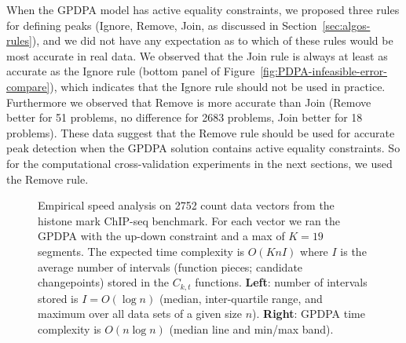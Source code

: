 \documentclass[twoside,11pt]{article}
\begin{document}
When the GPDPA model has active equality constraints, we proposed
three rules for defining peaks (Ignore, Remove, Join, as discussed in
Section~\ref{sec:algos-rules}), and we did not have any expectation as
to which of these rules would be most accurate in real data. We
observed that the Join rule is always at least as accurate as the
Ignore rule (bottom panel of
Figure~\ref{fig:PDPA-infeasible-error-compare}), which indicates that
the Ignore rule should not be used in practice. Furthermore we
observed that Remove is more accurate than Join (Remove better for 51
problems, no difference for 2683 problems, Join better for 18
problems). These data suggest that the Remove rule should be used for
accurate peak detection when the GPDPA solution contains active
equality constraints. So for the computational cross-validation
experiments in the next sections, we used the Remove rule.

%   




\begin{figure}[t!]
  \centering
  \parbox{0.49\textwidth}{
    
  }
  \parbox{0.49\textwidth}{
    
  }
  \vskip -0.5cm
  \caption{Empirical speed analysis on 2752 count data vectors from
    the histone mark ChIP-seq benchmark. For each vector we ran the
    GPDPA with the up-down constraint and a max of $K=19$
    segments. The expected time complexity is $O(KnI)$ where $I$ is
    the average number of intervals (function pieces; candidate
    changepoints) stored in the $C_{k,t}$ functions. \textbf{Left}:
    number of intervals stored is $I=O(\log n)$ (median,
    inter-quartile range, and maximum over all data sets of a given
    size $n$).  \textbf{Right}: GPDPA time complexity is $O(n\log n)$  (median
    line and min/max band).}
  \label{fig:timings}
\end{figure}
\end{document}
